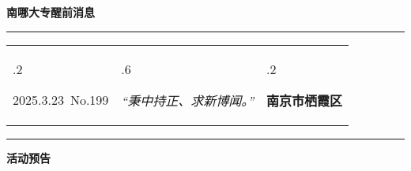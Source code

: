 \documentclass[letterpaper, 12pt]{article}
\begin{document}
\begin{center}
    \Huge\textbf{南哪大专醒前消息}
\end{center}
\vspace{4mm}
\hrule
\renewcommand\tabularxcolumn[1]{m{#1}}
\begin{tabularx}{\textwidth}{>{\hsize.2\hsize}X>{\hsize.6\hsize}X>{\hsize.2\hsize}X}
    \begin{flushleft}
        2025.3.23\, No.199
    \end{flushleft}
    &
    \begin{center}
        \textit{“秉中持正、求新博闻。”}
    \end{center}
    &
    \begin{flushright}
        \textbf{南京市栖霞区}
    \end{flushright}
\end{tabularx}
\vspace{-3.5mm}
\hrule
\vspace{4mm}
\centerline{\huge\textbf{活动预告}}
\end{document}
